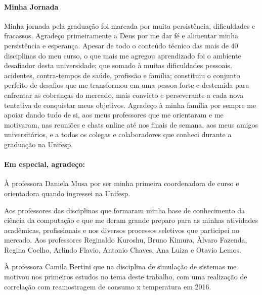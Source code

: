 \documentclass[	12pt, Times, openright, twoside, a4paper, english, brazil]{abntex2}
\begin{document}
    \begin{agradecimentos}
        \paragraph{Minha Jornada}
            Minha jornada pela graduação foi marcada por muita persistência, dificuldades e fracassos. Agradeço primeiramente a Deus por me dar fé e alimentar minha persistência e esperança. Apesar de todo o conteúdo técnico das mais de 40 disciplinas do meu curso, o que mais me agregou aprendizado foi o ambiente desafiador desta universidade; que somado à muitas dificuldades pessoais, acidentes, contra-tempos de saúde, profissão e família; constituiu o conjunto perfeito de desafios que me transformou em uma pessoa forte e destemida para enfrentar as cobranças do mercado, mais convicto e perseverante a cada nova tentativa de conquistar meus objetivos. Agradeço à minha família por sempre me apoiar dando tudo de si, aos meus professores que me orientaram e me motivaram, nas reuniões e chats online até nos finais de semana, aos meus amigos universitários, e a todos os colegas e colaboradores que conheci durante a graduação na Unifesp.
            
        \paragraph{Em especial, agradeço:}
                
            À professora Daniela Musa por ser minha primeira coordenadora de curso e orientadora quando ingressei na Unifesp.\newline
            
            Aos professores das disciplinas que formaram minha base de conhecimento da ciência da computação e que me deram grande preparo para as minhas atividades acadêmicas, profissionais e nos diversos processos seletivos que participei no mercado. Aos professores Reginaldo Kuroshu, Bruno Kimura, Àlvaro Fazenda, Regina Coelho, Arlindo Flavio, Antonio Chaves, Ana Luiza e Otavio Lemos.\newline
            
            À professora Camila Bertini  que na disciplina de simulação de sistemas me motivou nos primeiros estudos no tema deste trabalho, com uma realização de correlação com reamostragem de consumo x temperatura em 2016.\newline
            

\end{agradecimentos}
\end{document}
